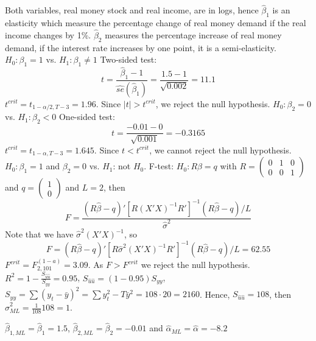 \documentclass{article}
\begin{document}
\begin{Answer}
\Question
	Both variables, real money stock and real income, are in logs, hence $\hat{\beta}_1$ is an elasticity which measure the percentage change of real money demand if the real income changes by 1\%. $\hat{\beta}_2$ measures the percentage increase of real money demand, if the interest rate increases by one point, it is a semi-elasticity.
\Question
\subQuestion $H_0: \beta_1=1$ vs. $H_1:\beta_1 \neq 1$ Two-sided test: $$t= \frac{\hat{\beta}_1 - 1}{\hat{se}(\hat{\beta}_1)} = \frac{1.5-1}{\sqrt{0.002}}=11.1$$
$t^{crit} = t_{1-\alpha/2,T-3} = 1.96$. Since $|t| > t^{crit}$, we reject the null hypothesis.
\subQuestion $H_0: \beta_2=0$ vs. $H_1:\beta_2 < 0$ One-sided test: $$t= \frac{-0.01 - 0}{\sqrt{0.001}}=-0.3165$$
$t^{crit} = t_{1-\alpha,T-3} = 1.645$. Since $t < t^{crit}$, we cannot reject the null hypothesis.
\subQuestion $H_0: \beta_1=1$ and $\beta_2=0$ vs. $H_1$: not $H_0$. F-test: $H_0:R\beta = q$ with $R=\begin{pmatrix}0 & 1 & 0\\0 & 0 & 1\end{pmatrix}$ and $q=\begin{pmatrix}1\\0\end{pmatrix}$ and $L=2$, then
$$F=\frac{(R\hat{\beta}-q)'[R(X'X)^{-1}R']^{-1}(R\hat{\beta}-q)/L}{\hat{\sigma}^2}$$
Note that we have $\hat{\sigma}^2 (X'X)^{-1}$, so 
$$F=(R\hat{\beta}-q)'[R\hat{\sigma}^2(X'X)^{-1}R']^{-1}(R\hat{\beta}-q)/L = 62.55$$
$F^{crit} = F^(1-a)_{2,101} = 3.09$. As $F>F^{crit}$ we reject the null hypothesis.
\Question $R^2 = 1-\frac{S_{\hat{u}\hat{u}}}{S_{yy}}=0.95$, $S_{\hat{u}\hat{u}} = (1-0.95)S_{yy}$, $S_{yy} = \sum (y_t -\bar{y})^2 = \sum y_t^2 - T\bar{y}^2 = 108\cdot 20 =2160$.
Hence, $S_{\hat{u}\hat{u}} = 108$, then $\hat{\sigma}^2_{ML} = \frac{1}{108}108 = 1$.

$\hat{\beta}_{1,ML} = \hat{\beta}_1 = 1.5$, $\hat{\beta}_{2,ML} = \hat{\beta}_2 = -0.01$ and $\hat{\alpha}_{ML} = \hat{\alpha} = -8.2$
\end{Answer}

\newpage
\end{document}
